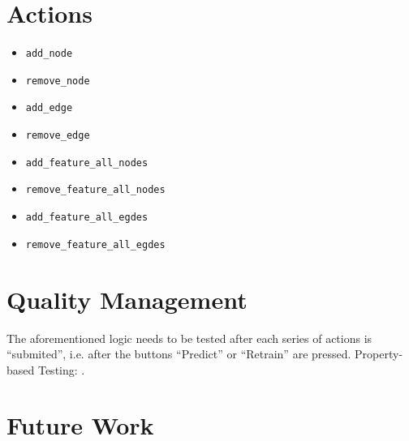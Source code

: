 \documentclass[12p3, letterpaper, twoside]{article}
\begin{document}
\section{Actions}

\begin{itemize}
	\item \texttt{add\_node}
	\item \texttt{remove\_node}
	\item \texttt{add\_edge}
	\item \texttt{remove\_edge} 
	\item \texttt{add\_feature\_all\_nodes}
	\item \texttt{remove\_feature\_all\_nodes} 
	\item \texttt{add\_feature\_all\_egdes}
	\item \texttt{remove\_feature\_all\_egdes} 
\end{itemize}

\section{Quality Management}
\label{Quality Management}

The aforementioned logic needs to be tested after each series of actions is ``submited'', i.e. after the buttons ``Predict'' or ``Retrain'' are pressed. Property-based Testing: \cite{Saranti:2020:PropertyBasedTesting}.

\section{Future Work}
\label{Future Work}




\end{document}

